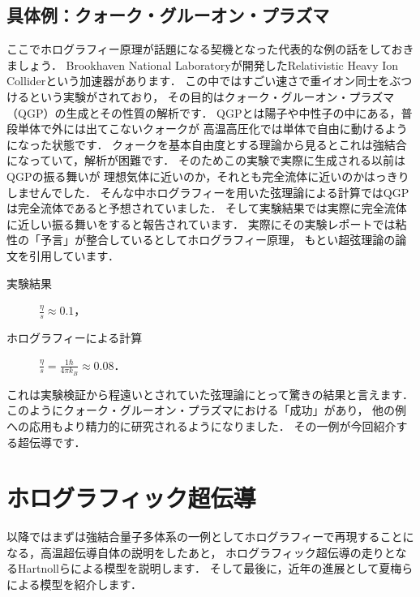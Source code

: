 \documentclass[b5paper,11pt,dvipdfmx]{jsarticle}
\numberwithin{equation}{section}
\theoremstyle{definition}
\begin{document}
\subsection{具体例：クォーク・グルーオン・プラズマ}
ここでホログラフィー原理が話題になる契機となった代表的な例の話をしておきましょう．
Brookhaven National Laboratoryが開発したRelativistic Heavy Ion Colliderという加速器があります．
この中ではすごい速さで重イオン同士をぶつけるという実験がされており，
その目的はクォーク・グルーオン・プラズマ（QGP）の生成とその性質の解析です．
QGPとは陽子や中性子の中にある，普段単体で外には出てこないクォークが
高温高圧化では単体で自由に動けるようになった状態です．
クォークを基本自由度とする理論から見るとこれは強結合になっていて，解析が困難です．
そのためこの実験で実際に生成される以前はQGPの振る舞いが
理想気体に近いのか，それとも完全流体に近いのかはっきりしませんでした．
そんな中ホログラフィーを用いた弦理論による計算ではQGPは完全流体であると予想されていました\cite{Policastro01,Kovtun04}．
そして実験結果では実際に完全流体に近しい振る舞いをすると報告されています\cite{PHENIX06}．
実際にその実験レポートでは粘性の「予言」が整合しているとしてホログラフィー原理，
もとい超弦理論の論文\cite{Kovtun04}を引用しています．
\begin{description}
    \item[実験結果] $\frac{\eta}{s} \approx 0.1$，
    \item[ホログラフィーによる計算] $\frac{\eta}{s} = \frac{1 \hbar}{4 \pi k_B} \approx 0.08$．
\end{description}
これは実験検証から程遠いとされていた弦理論にとって驚きの結果と言えます．
このようにクォーク・グルーオン・プラズマにおける「成功」があり，
他の例への応用もより精力的に研究されるようになりました．
その一例が今回紹介する超伝導です．


\section{ホログラフィック超伝導}
以降ではまずは強結合量子多体系の一例としてホログラフィーで再現することになる，高温超伝導自体の説明をしたあと，
ホログラフィック超伝導の走りとなるHartnollらによる模型\cite{Hartnoll08a,Hartnoll08b}を説明します．
そして最後に，近年の進展として夏梅らによる模型\cite{Natsuume22}を紹介します．
\end{document}
